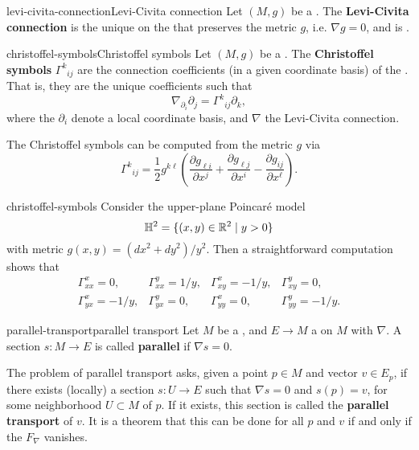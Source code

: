 \begin{topic}{levi-civita-connection}{Levi-Civita connection}
    Let $(M, g)$ be a . The \textbf{Levi-Civita connection} is the unique  on the  that preserves the metric $g$, i.e. $\nabla g = 0$, and is .
\end{topic}

\begin{topic}{christoffel-symbols}{Christoffel symbols}
    Let $(M, g)$ be a . The \textbf{Christoffel symbols} ${\Gamma^k}_{ij}$ are the connection coefficients (in a given coordinate basis) of the . That is, they are the unique coefficients such that
    \[ \nabla_{\partial_i} \partial_j = {\Gamma^k}_{ij} \partial_k , \]
    where the $\partial_i$ denote a local coordinate basis, and $\nabla$ the Levi-Civita connection.
    
    The Christoffel symbols can be computed from the metric $g$ via
    \[ {\Gamma^k}_{ij} = \frac{1}{2} g^{k \ell} \left(\frac{\partial g_{\ell i}}{\partial x^j} + \frac{\partial g_{\ell j}}{\partial x^i} - \frac{\partial g_{ij}}{\partial x^\ell} \right) . \]
\end{topic}

\begin{example}{christoffel-symbols}
    Consider the upper-plane Poincaré model
    \[ \mathbb{H}^2 = \{ (x, y) \in \mathbb{R}^2 \mid y > 0 \}  \]
    with metric $g(x, y) = (dx^2 + dy^2) / y^2$. Then a straightforward computation shows that
    \[ \begin{array}{cccc}
        \Gamma_{xx}^x = 0, & \Gamma_{xx}^y = 1/y, & \Gamma_{xy}^x = -1/y, & \Gamma_{xy}^y = 0, \\
        \Gamma_{yx}^x = -1/y, & \Gamma_{yx}^y = 0, & \Gamma_{yy}^x = 0, & \Gamma_{yy}^y = -1/y .
    \end{array} \]
\end{example}

\begin{topic}{parallel-transport}{parallel transport}
    Let $M$ be a , and $E \to M$ a  on $M$ with  $\nabla$. A section $s : M \to E$ is called \textbf{parallel} if $\nabla s = 0$.
    
    The problem of parallel transport asks, given a point $p \in M$ and vector $v \in E_p$, if there exists (locally) a section $s : U \to E$ such that $\nabla s = 0$ and $s(p) = v$, for some neighborhood $U \subset M$ of $p$. If it exists, this section is called the \textbf{parallel transport} of $v$. It is a theorem that this can be done for all $p$ and $v$ if and only if the  $F_\nabla$ vanishes.
\end{topic}

